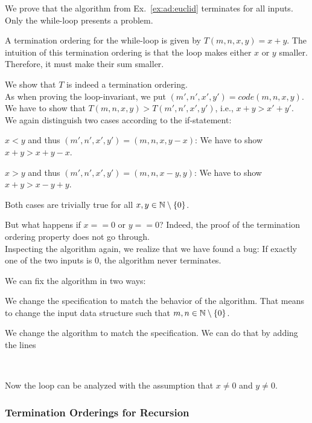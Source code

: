 \begin{example}\label{ex:ad:euclid:term}
We prove that the algorithm from Ex.~\ref{ex:ad:euclid} terminates for all inputs.
Only the while-loop presents a problem.

A termination ordering for the while-loop is given by $T(m,n,x,y)=x+y$.
The intuition of this termination ordering is that the loop makes either $x$ or $y$ smaller.
Therefore, it must make their sum smaller.
\medskip

We show that $T$ is indeed a termination ordering.\\
As when proving the loop-invariant, we put $(m',n',x',y')=code(m,n,x,y)$.\\
We have to show that $T(m,n,x,y)>T(m',n',x',y')$, i.e., $x+y>x'+y'$.\\
We again distinguish two cases according to the if-statement:
\begin{compactitem}
 \item $x<y$ and thus $(m',n',x',y')=(m,n,x,y-x)$: We have to show $x+y>x+y-x$.
 \item $x>y$ and thus $(m',n',x',y')=(m,n,x-y,y)$: We have to show $x+y>x-y+y$.
\end{compactitem}
Both cases are trivially true for all $x,y\in\mathbb{N}\setminus\{0\}$.

But what happens if $x==0$ or $y==0$?
Indeed, the proof of the termination ordering property does not go through.\\
Inspecting the algorithm again, we realize that we have found a bug: If exactly one of the two inputs is $0$, the algorithm never terminates.

We can fix the algorithm in two ways:
\begin{compactitem}
 \item We change the specification to match the behavior of the algorithm.
 That means to change the input data structure such that $m,n\in\mathbb{N}\setminus\{0\}$.
 \item We change the algorithm to match the specification.
  We can do that by adding the lines
  \begin{acode}
    \\
  \end{acode}
  Now the loop can be analyzed with the assumption that $x\neq 0$ and $y\neq 0$.
\end{compactitem}
\end{example}

\subsubsection{Termination Orderings for Recursion}

